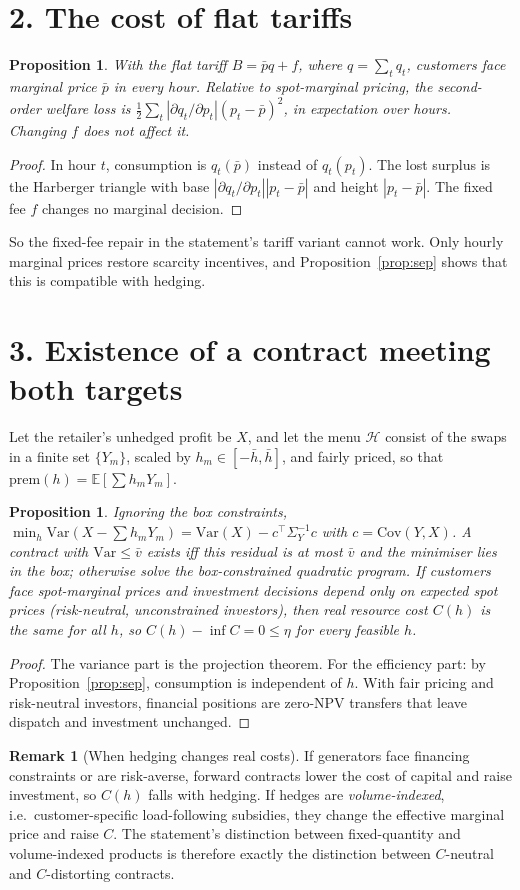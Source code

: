 \documentclass[11pt]{article}
\newtheorem{proposition}[theorem]{Proposition}
\theoremstyle{definition}
\newtheorem{remark}[theorem]{Remark}
\begin{document}
\section*{2. The cost of flat tariffs}
\begin{proposition}\label{prop:flat}
With the flat tariff $B=\bar pq+f$, where $q=\sum_tq_t$, customers face marginal price $\bar p$ in every hour. Relative to
spot-marginal pricing, the second-order welfare loss is $\tfrac12\sum_t|\partial q_t/\partial p_t|(p_t-\bar p)^2$, in
expectation over hours. Changing $f$ does not affect it.
\end{proposition}
\begin{proof}
In hour $t$, consumption is $q_t(\bar p)$ instead of $q_t(p_t)$. The lost surplus is the Harberger triangle with base
$|\partial q_t/\partial p_t||p_t-\bar p|$ and height $|p_t-\bar p|$. The fixed fee $f$ changes no marginal decision.
\end{proof}
So the fixed-fee repair in the statement's tariff variant cannot work. Only hourly marginal prices restore scarcity
incentives, and Proposition~\ref{prop:sep} shows that this is compatible with hedging.

\section*{3. Existence of a contract meeting both targets}
Let the retailer's unhedged profit be $X$, and let the menu $\mathcal H$ consist of the swaps in a finite set $\{Y_m\}$, scaled by
$h_m\in[-\bar h,\bar h]$, and fairly priced, so that $\mathrm{prem}(h)=\mathbb E[\sum h_mY_m]$.
\begin{proposition}\label{prop:exist}
Ignoring the box constraints, $\min_h\mathrm{Var}(X-\sum h_mY_m)=\mathrm{Var}(X)-c^\top\Sigma_Y^{-1}c$ with
$c=\mathrm{Cov}(Y,X)$. A contract with $\mathrm{Var}\le\bar v$ exists iff this residual is at most $\bar v$ and the minimiser
lies in the box; otherwise solve the box-constrained quadratic program. If customers face spot-marginal prices and investment
decisions depend only on expected spot prices (risk-neutral, unconstrained investors), then real resource cost $C(h)$ is the same
for all $h$, so $C(h)-\inf C=0\le\eta$ for every feasible $h$.
\end{proposition}
\begin{proof}
The variance part is the projection theorem. For the efficiency part: by Proposition~\ref{prop:sep}, consumption is
independent of $h$. With fair pricing and risk-neutral investors, financial positions are zero-NPV transfers that leave
dispatch and investment unchanged.
\end{proof}
\begin{remark}[When hedging changes real costs]
If generators face financing constraints or are risk-averse, forward contracts lower the cost of capital and raise
investment, so $C(h)$ falls with hedging. If hedges are \emph{volume-indexed}, i.e.\ customer-specific load-following
subsidies, they change the effective marginal price and raise $C$. The statement's distinction between fixed-quantity and
volume-indexed products is therefore exactly the distinction between $C$-neutral and $C$-distorting contracts.
\end{remark}
\end{document}
